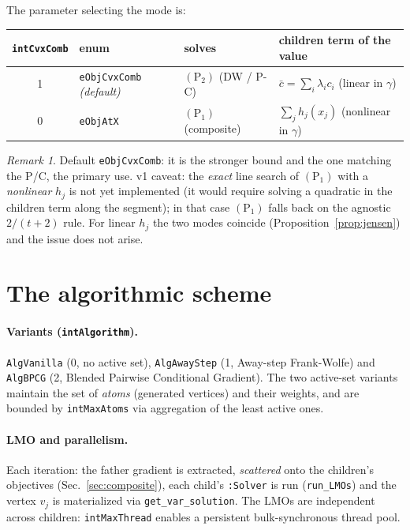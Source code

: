 \documentclass[11pt,a4paper]{article}
\newcommand{\code}[1]{\texttt{#1}}
\newcommand{\Pone}{(\mathrm{P}_1)}
\newcommand{\Ptwo}{(\mathrm{P}_2)}
\theoremstyle{plain}
\theoremstyle{remark}
\newtheorem*{remark}{Remark}
\begin{document}
The parameter selecting the mode is:
\begin{center}
\begin{tabular}{@{}clll@{}}
\toprule
\code{intCvxComb} & enum & solves & children term of the value\\
\midrule
1 & \code{eObjCvxComb} \emph{(default)} & $\Ptwo$ (DW / P-C) & $\bar c=\sum_i\lambda_i c_i$ (linear in $\gamma$)\\
0 & \code{eObjAtX}                       & $\Pone$ (composite) & $\sum_j h_j(x_j)$ (nonlinear in $\gamma$)\\
\bottomrule
\end{tabular}
\end{center}

\begin{remark}
Default \code{eObjCvxComb}: it is the stronger bound and the one matching the
P/C, the primary use. v1 caveat: the \emph{exact} line search of $\Pone$ with a
\emph{nonlinear} $h_j$ is not yet implemented (it would require solving a
quadratic in the children term along the segment); in that case $\Pone$ falls back
on the agnostic $2/(t+2)$ rule. For linear $h_j$ the two modes coincide
(Proposition~\ref{prop:jensen}) and the issue does not arise.
\end{remark}

\section{The algorithmic scheme}\label{sec:algo}

\paragraph{Variants (\code{intAlgorithm}).}
\code{AlgVanilla} (0, no active set), \code{AlgAwayStep} (1, Away-step
Frank-Wolfe) and \code{AlgBPCG} (2, Blended Pairwise Conditional Gradient). The
two active-set variants maintain the set of \emph{atoms} (generated vertices) and
their weights, and are bounded by \code{intMaxAtoms} via aggregation of the least
active ones.

\paragraph{LMO and parallelism.}
Each iteration: the father gradient is extracted, \emph{scattered} onto the
children's objectives (Sec.~\ref{sec:composite}), each child's \code{:Solver} is
run (\code{run\_LMOs}) and the vertex $v_j$ is materialized via
\code{get\_var\_solution}. The LMOs are independent across children:
\code{intMaxThread} enables a persistent bulk-synchronous thread pool.
\end{document}
